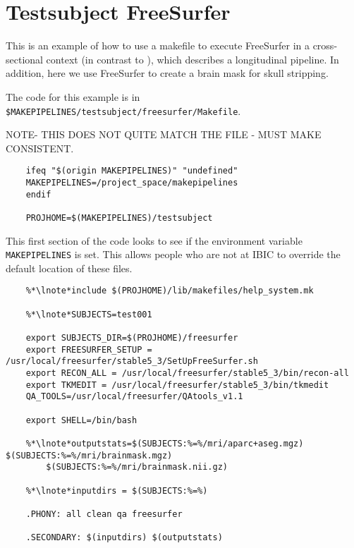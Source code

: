 \section{Testsubject FreeSurfer}
\label{example:freesurfer}

This is an example of how to use a makefile to execute FreeSurfer in a cross-sectional context (in contrast to
), which describes a longitudinal pipeline.  In addition, here we use FreeSurfer to
create a brain mask for skull stripping.

The code for this example is in \texttt{\$MAKEPIPELINES/testsubject/freesurfer/Makefile}.

NOTE- THIS DOES NOT QUITE MATCH THE FILE - MUST MAKE CONSISTENT.

\setcounter{codehighlight}{0} %

\begin{lstlisting}
	ifeq "$(origin MAKEPIPELINES)" "undefined"
	MAKEPIPELINES=/project_space/makepipelines
	endif

	PROJHOME=$(MAKEPIPELINES)/testsubject 
\end{lstlisting}

This first section of the code looks to see if the environment variable
\texttt{MAKEPIPELINES} is set. This allows people who are not at IBIC
to override the default location of these files.

\begin{lstlisting}
	%*\lnote*include $(PROJHOME)/lib/makefiles/help_system.mk 

	%*\lnote*SUBJECTS=test001 

	export SUBJECTS_DIR=$(PROJHOME)/freesurfer 
	export FREESURFER_SETUP = /usr/local/freesurfer/stable5_3/SetUpFreeSurfer.sh 
	export RECON_ALL = /usr/local/freesurfer/stable5_3/bin/recon-all 
	export TKMEDIT = /usr/local/freesurfer/stable5_3/bin/tkmedit 
	QA_TOOLS=/usr/local/freesurfer/QAtools_v1.1 

	export SHELL=/bin/bash

	%*\lnote*outputstats=$(SUBJECTS:%=%/mri/aparc+aseg.mgz) $(SUBJECTS:%=%/mri/brainmask.mgz)
		$(SUBJECTS:%=%/mri/brainmask.nii.gz)

	%*\lnote*inputdirs = $(SUBJECTS:%=%)

	.PHONY: all clean qa freesurfer

	.SECONDARY: $(inputdirs) $(outputstats)
\end{lstlisting}

